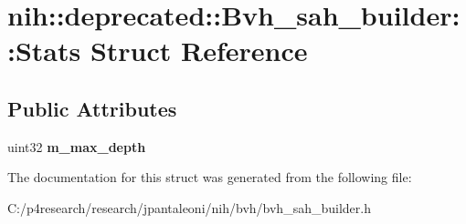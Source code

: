 \hypertarget{structnih_1_1deprecated_1_1_bvh__sah__builder_1_1_stats}{
\section{nih\-:\-:deprecated\-:\-:\-Bvh\-\_\-sah\-\_\-builder\-:\-:\-Stats \-Struct \-Reference}
\label{structnih_1_1deprecated_1_1_bvh__sah__builder_1_1_stats}
}
\subsection*{\-Public \-Attributes}
\begin{DoxyCompactItemize}
\item 
\hypertarget{structnih_1_1deprecated_1_1_bvh__sah__builder_1_1_stats_ac74f44c1f7aa2bb4cbda3e4e5b32120d}{
uint32 {\bfseries m\-\_\-max\-\_\-depth}}
\label{structnih_1_1deprecated_1_1_bvh__sah__builder_1_1_stats_ac74f44c1f7aa2bb4cbda3e4e5b32120d}

\end{DoxyCompactItemize}


\-The documentation for this struct was generated from the following file\-:\begin{DoxyCompactItemize}
\item 
\-C\-:/p4research/research/jpantaleoni/nih/bvh/bvh\-\_\-sah\-\_\-builder.\-h\end{DoxyCompactItemize}
